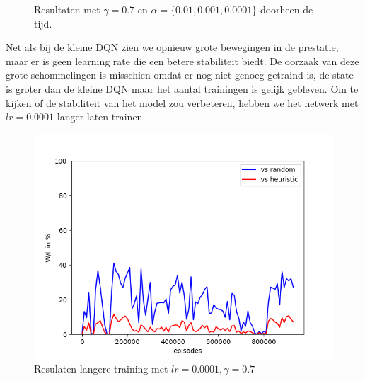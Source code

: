 \documentclass[11pt]{article}
\begin{document}
\begin{figure}[H]
    \centering
    \qquad
    \caption{Resultaten met $\gamma = 0.7$ en $\alpha = \{0.01, 0.001, 0.0001\}$ doorheen de tijd.}
\end{figure}
\noindent Net als bij de kleine DQN zien we opnieuw grote bewegingen in de prestatie, maar er is geen learning rate die een betere stabiliteit biedt. De oorzaak van deze grote schommelingen is misschien omdat er nog niet genoeg getraind is, de state is groter dan de kleine DQN maar het aantal trainingen is gelijk gebleven. Om te kijken of de stabiliteit van het model zou verbeteren, hebben we het netwerk met $ lr = 0.0001$ langer laten trainen.
\begin{figure}[H]
\centering
\includegraphics[scale=0.45]{images/big_dqn_extended_training.png}
\caption{Resulaten langere training met $lr = 0.0001, \gamma = 0.7$}
\end{figure}
\end{document}

